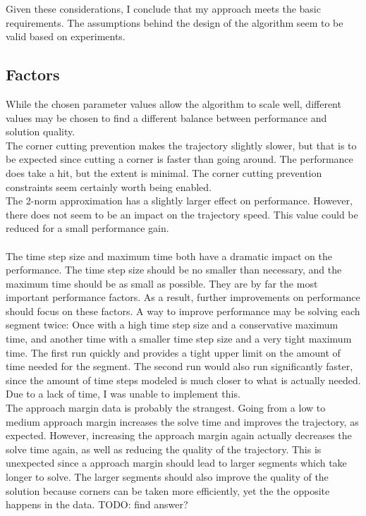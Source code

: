 Given these considerations, I conclude that my approach meets the basic requirements. The assumptions behind the design of the algorithm seem to be valid based on experiments.

\subsection{Factors}
While the chosen parameter values allow the algorithm to scale well, different values may be chosen to find a different balance between performance and solution quality. \\
The corner cutting prevention makes the trajectory slightly slower, but that is to be expected since cutting a corner is faster than going around. The performance does take a hit, but the extent is minimal. The corner cutting prevention constraints seem certainly worth being enabled. \\
The 2-norm approximation has a slightly larger effect on performance. However, there does not seem to be an impact on the trajectory speed. This value could be reduced for a small performance gain. \\ \\

The time step size and maximum time both have a dramatic impact on the performance. The time step size should be no smaller than necessary, and the maximum time should be as small as possible. They are by far the most important performance factors. As a result, further improvements on performance should focus on these factors. A way to improve performance may be solving each segment twice: Once with a high time step size and a conservative maximum time, and another time with a smaller time step size and a very tight maximum time. The first run quickly and provides a tight upper limit on the amount of time needed for the segment. The second run would also run significantly faster, since the amount of time steps modeled is much closer to what is actually needed. Due to a lack of time, I was unable to implement this. \\

The approach margin data is probably the strangest. Going from a low to medium approach margin increases the solve time and improves the trajectory, as expected. However, increasing the approach margin again actually decreases the solve time again, as well as reducing the quality of the trajectory. This is unexpected since a approach margin should lead to larger segments which take longer to solve. The larger segments should also improve the quality of the solution because corners can be taken more efficiently, yet the the opposite happens in the data. TODO: find answer?






